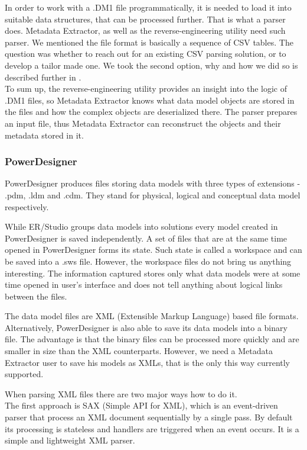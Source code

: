 In order to work with a .DM1 file programmatically, it is needed to load it into suitable data structures, that can be processed further. That is what a parser does. 
Metadata Extractor, as well as the reverse-engineering utility need such parser.
We mentioned the file format is basically a sequence of CSV tables. 
The question was whether to reach out for an existing CSV parsing solution, or to develop a tailor made one.
We took the second option, why and how we did so is described further in . \\

To sum up, the reverse-engineering utility provides an insight into the logic of .DM1 files, so Metadata Extractor knows what data model objects are stored in the files and how the complex objects are deserialized there. The parser prepares an input file, thus Metadata Extractor can reconstruct the objects and their metadata stored in it.

\subsubsection{PowerDesigner}

PowerDesigner produces files storing data models with three types of extensions - .pdm, .ldm and .cdm.
They stand for physical, logical and conceptual data model respectively.

While ER/Studio groups data models into solutions every model created in PowerDesigner is saved independently. 
A set of files that are at the same time opened in PowerDesigner forms its state. 
Such state is called a workspace and can be saved into a .sws file. However, the workspace files do not bring us anything interesting. 
The information captured stores only what data models were at some time opened in user's interface and does not tell anything about logical links between the files.

The data model files are XML (Extensible Markup Language) based file formats.
Alternatively, PowerDesigner is also able to save its data models into a binary file. The advantage is that the binary files can be processed more quickly and are smaller in size than the XML counterparts. 
However, we need a Metadata Extractor user to save his models as XMLs, that is the only this way currently supported.

When parsing XML files there are two major ways how to do it. \\

The first approach is SAX (Simple API for XML), which is an event-driven parser that process an XML document sequentially by a single pass. 
By default its processing is stateless and handlers are triggered when an event occurs. 
It is a simple and lightweight XML parser. \\

